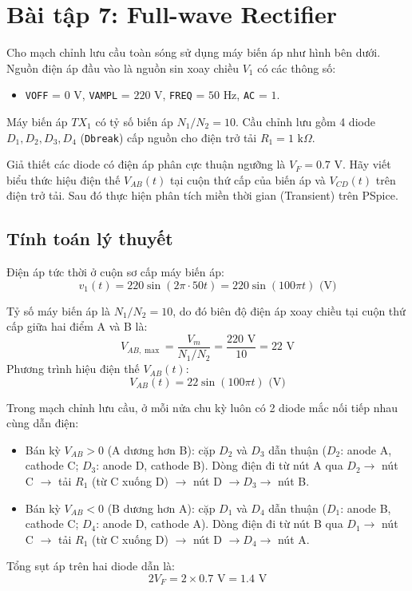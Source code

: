 \section{Bài tập 7: Full-wave Rectifier}

Cho mạch chỉnh lưu cầu toàn sóng sử dụng máy biến áp như hình bên dưới. Nguồn điện áp đầu vào là nguồn sin xoay chiều $V_1$ có các thông số:
\begin{itemize}[leftmargin=1.5em]
  \item \texttt{VOFF} = $0\text{ V}$, \texttt{VAMPL} = $220\text{ V}$, \texttt{FREQ} = $50\text{ Hz}$, \texttt{AC} = $1$.
\end{itemize}
Máy biến áp $TX_1$ có tỷ số biến áp $N_1/N_2 = 10$. Cầu chỉnh lưu gồm 4 diode $D_1, D_2, D_3, D_4$ (\texttt{Dbreak}) cấp nguồn cho điện trở tải $R_1 = 1\text{ k}\Omega$.

Giả thiết các diode có điện áp phân cực thuận ngưỡng là $V_F = 0.7\text{ V}$. Hãy viết biểu thức hiệu điện thế $V_{AB}(t)$ tại cuộn thứ cấp của biến áp và $V_{CD}(t)$ trên điện trở tải. Sau đó thực hiện phân tích miền thời gian (Transient) trên PSpice.


\subsection{Tính toán lý thuyết}
Điện áp tức thời ở cuộn sơ cấp máy biến áp:
\begin{equation}
  v_1(t) = 220 \sin(2\pi \cdot 50 t) = 220 \sin(100\pi t)\text{ (V)}
\end{equation}

\noindent Tỷ số máy biến áp là $N_1/N_2 = 10$, do đó biên độ điện áp xoay chiều tại cuộn thứ cấp giữa hai điểm A và B là:
\begin{equation}
  V_{AB,\max} = \frac{V_m}{N_1/N_2} = \frac{220\text{ V}}{10} = 22\text{ V}
\end{equation}
\noindent Phương trình hiệu điện thế $V_{AB}(t)$:
\begin{equation}
  V_{AB}(t) = 22 \sin(100\pi t)\text{ (V)}
\end{equation}

\noindent Trong mạch chỉnh lưu cầu, ở mỗi nửa chu kỳ luôn có 2 diode mắc nối tiếp nhau cùng dẫn điện:
\begin{itemize}[leftmargin=1.5em]
  \item Bán kỳ $V_{AB} > 0$ (A dương hơn B): cặp $D_2$ và $D_3$ dẫn thuận ($D_2$: anode A, cathode C; $D_3$: anode D, cathode B). Dòng điện đi từ nút A qua $D_2 \to$ nút C $\to$ tải $R_1$ (từ C xuống D) $\to$ nút D $\to D_3 \to$ nút B.
  \item Bán kỳ $V_{AB} < 0$ (B dương hơn A): cặp $D_1$ và $D_4$ dẫn thuận ($D_1$: anode B, cathode C; $D_4$: anode D, cathode A). Dòng điện đi từ nút B qua $D_1 \to$ nút C $\to$ tải $R_1$ (từ C xuống D) $\to$ nút D $\to D_4 \to$ nút A.
\end{itemize}
Tổng sụt áp trên hai diode dẫn là:
\begin{equation}
  2V_F = 2 \times 0.7\text{ V} = 1.4\text{ V}
\end{equation}


